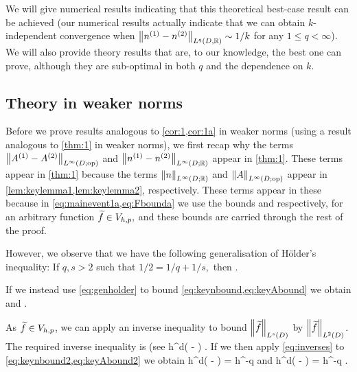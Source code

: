 We will give numerical results indicating that this theoretical best-case result can be achieved (our numerical results actually indicate that we can obtain $k$-independent convergence when $\NLqDRR{\nso-\nst}\sim 1/k$ for any $1 \leq q < \infty$). We will also provide theory results that are, to our knowledge, the best one can prove, although they are sub-optimal in both $q$ and the dependence on $k.$


\subsection{Theory in weaker norms}\label{sec:weakertheory}
Before we prove results analogous to \cref{cor:1,cor:1a} in weaker norms (using a result analogous to \cref{thm:1} in weaker norms), we first recap why the terms  $\NLiDop{\Aso-\Ast}$ and $\NLiDRR{\nso-\nst}$ appear in \cref{thm:1}. These terms appear in \cref{thm:1} because the terms $\NLiDRR{n}$ and $\NLiDop{A}$ appear in \cref{lem:keylemma1,lem:keylemma2}, respectively. These terms appear in these  because in \cref{eq:mainevent1a,eq:Fbounda} we use the bounds
\beq\label{eq:keynbound}
 \leq {}\NLtD{\ftilde}
\eeq
and
\beq\label{eq:keyAbound}
 \leq {}\NLtD{\grad \ftilde}
\eeq
respectively, for an arbitrary function $\widetilde{f} \in V_{h,p},$ and these bounds are carried through the rest of the proof.

However, we observe that we have the following generalisation of H\"older's inequality: If $q,s > 2$ such that $1/2 = 1/q+1/s,$ then
\beq\label{eq:genholder}
\NLtD{\vo\vt} \leq \NLqD{\vo}\NLsD{\vt}.
\eeq

If we instead use \cref{eq:genholder} to bound \cref{eq:keynbound,eq:keyAbound} we obtain
\beq\label{eq:keynbound2}
 \leq {}\NLsD{\ftilde}
\eeq
and
\beq\label{eq:keyAbound2}
 \leq {}\NLsD{\grad\ftilde}.
\eeq

As $\widetilde{f} \in V_{h,p}$, we can apply an inverse inequality to bound $\NLsD{\ftilde}$ by $\NLtD{\ftilde}$. The required inverse inequality is (see \cite[Theorem 4.5.11 and Remark 4.5.20]{BrSc:08}
\beq\label{eq:inverses}
\NLsD{\ftilde} \leq \Cinvs h^{d\mleft( - \half\mright)} \NLtD{\ftilde}.
\eeq
If we then apply \cref{eq:inverses} to \cref{eq:keynbound2,eq:keyAbound2} we obtain
\beq\label{eq:keynboundfinal}
 \leq \Cinvs {} h^{d\mleft( - \half\mright)} \NLtD{\ftilde} = \Cinvs {} h^{-q} \NLtD{\ftilde}
\eeq
and
\beq\label{eq:keyAboundfinal}
 \leq \Cinvs {} h^{d\mleft( - \half\mright)} \NLtD{\grad\ftilde} = \Cinvs {} h^{-q} \NLtD{\grad\ftilde}.
\eeq

